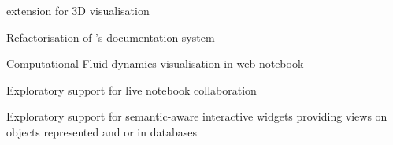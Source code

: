 \begin{workpackage}
\begin{wpdelivs}
  \begin{wpdeliv}[due=24,id=vis3d,miles=proto1,dissem=PU,nature=OTHER,lead=SR,issue=86]
      {\Jupyter extension for 3D visualisation}
  \end{wpdeliv}
  \begin{wpdeliv}[due=24,miles=proto1,id=sage-sphinx,dissem=PU,nature=OTHER,lead=UG,issue=87]
      {Refactorisation of \Sage's \Sphinx documentation system}
  \end{wpdeliv}
  \begin{wpdeliv}[due=36,miles=community,id=cfd-vis,dissem=PU,nature=OTHER,lead=SR,issue=88]
      {Computational Fluid dynamics visualisation in web notebook}
  \end{wpdeliv}
  \begin{wpdeliv}[due=36,miles=community,id=jupyter-live-collab,dissem=PU,nature=OTHER,lead=SR,issue=89]
      {Exploratory support for live notebook collaboration}
  \end{wpdeliv}
  \begin{wpdeliv}[due=36,id=ipython-advanced-interacts,dissem=PU,nature=DEM,lead=PS,issue=90]
      {Exploratory support for semantic-aware interactive widgets providing views on objects
      represented and or in databases}
  \end{wpdeliv}


  \end{wpdelivs}
\end{workpackage}

